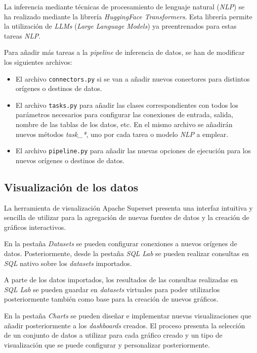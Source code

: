 La inferencia mediante técnicas de procesamiento de lenguaje natural (\textit{NLP}) se ha realizado mediante la librería \textit{HuggingFace Transformers}. Esta librería permite la utilización de \textit{LLMs} (\textit{Large Language Models}) ya preentrenados para estas tareas \textit{NLP}.

Para añadir más tareas a la \textit{pipeline} de inferencia de datos, se han de modificar los siguientes archivos:

\begin{itemize}
    \item El archivo \texttt{connectors.py} si se van a añadir nuevos conectores para distintos orígenes o destinos de datos.
    \item El archivo \texttt{tasks.py} para añadir las clases correspondientes con todos los parámetros necesarios para configurar las conexiones de entrada, salida, nombre de las tablas de los datos, etc. En el mismo archivo se añadirán nuevos métodos \textit{task\_*}, uno por cada tarea o modelo \textit{NLP} a emplear.
    \item El archivo \texttt{pipeline.py} para añadir las nuevas opciones de ejecución para los nuevos orígenes o destinos de datos.
\end{itemize}

\subsection{Visualización de los datos}

La herramienta de visualización Apache Superset presenta una interfaz intuitiva y sencilla de utilizar para la agregación de nuevas fuentes de datos y la creación de gráficos interactivos.

En la pestaña \textit{Datasets} se pueden configurar conexiones a nuevos orígenes de datos. Posteriormente, desde la pestaña \textit{SQL Lab} se pueden realizar consultas en \textit{SQL} nativo sobre los \textit{datasets} importados.

A parte de los datos importados, los resultados de las consultas realizadas en \textit{SQL Lab} se pueden guardar en \textit{datasets} virtuales para poder utilizarlos posteriormente también como base para la creación de nuevos gráficos.

En la pestaña \textit{Charts} se pueden diseñar e implementar nuevas visualizaciones que añadir posteriormente a los \textit{dashboards} creados. El proceso presenta la selección de un conjunto de datos a utilizar para cada gráfico creado y un tipo de visualización que se puede configurar y personalizar posteriormente.

